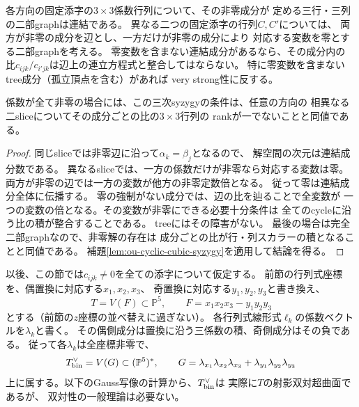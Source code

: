 \begin{corollary}[係数の台に対する必要条件]
\label{cor:ou-cyclic-support-obstruction}
各方向の固定添字の$3\times3$係数行列について、その非零成分が
定める三行・三列の二部graphは連結である。
異なる二つの固定添字の行列$C,C'$については、
両方が非零の成分を辺とし、一方だけが非零の成分により
対応する変数を零とする二部graphを考える。
零変数を含まない連結成分があるなら、その成分内の
比$c_{ijk}/c_{i'jk}$は辺上の連立方程式と整合してはならない。
特に零変数を含まないtree成分（孤立頂点を含む）があれば
very strong性に反する。

係数が全て非零の場合には、この三次syzygyの条件は、任意の方向の
相異なる二sliceについてその成分ごとの比の$3\times3$行列の
rankが一でないことと同値である。
\end{corollary}
\begin{proof}
同じsliceでは非零辺に沿って$\alpha_k=\beta_j$となるので、
解空間の次元は連結成分数である。
異なるsliceでは、一方の係数だけが非零なら対応する変数は零。
両方が非零の辺では一方の変数が他方の非零定数倍となる。
従って零は連結成分全体に伝播する。
零の強制がない成分では、辺の比を辿ることで全変数が
一つの変数の倍となる。その変数が非零にできる必要十分条件は
全てのcycleに沿う比の積が整合することである。
treeにはその障害がない。
最後の場合は完全二部graphなので、非零解の存在は
成分ごとの比が行・列スカラーの積となることと同値である。
補題\ref{lem:ou-cyclic-cubic-syzygy}を適用して結論を得る。
\end{proof}

以後、この節では$c_{ijk}\ne0$を全ての添字について仮定する。
前節の行列式座標を、偶置換に対応する$x_1,x_2,x_3$、
奇置換に対応する$y_1,y_2,y_3$と書き換え、
\[
 T=V(F)\subset\mathbb P^5,\qquad
 F=x_1x_2x_3-y_1y_2y_3
\]
とする（前節の$z$座標の並べ替えに過ぎない）。
各行列式線形式$\ell_k$の係数ベクトルを$\lambda_k$と書く。
その偶側成分は置換に沿う三係数の積、奇側成分はその負である。
従って各$\lambda_k$は全座標非零で、
\[
 T^\vee_{\rm bin}=V(G)\subset(\mathbb P^5)^*,\qquad
 G=\lambda_{x_1}\lambda_{x_2}\lambda_{x_3}
    +\lambda_{y_1}\lambda_{y_2}\lambda_{y_3}
\]
上に属する。以下のGauss写像の計算から、$T^\vee_{\rm bin}$は
実際に$T$の射影双対超曲面であるが、
双対性の一般理論は必要ない。


